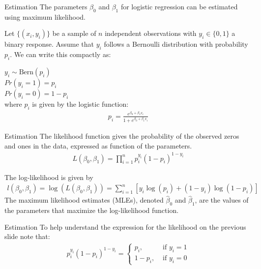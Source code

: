 \documentclass[10pt]{beamer}\usepackage[]{graphicx}\usepackage[]{color}
\begin{document}
\begin{frame}{Estimation}
The parameters $\beta_0$ and $\beta_1$ for logistic regression can be estimated using maximum likelihood.\\
\vspace{10pt}

Let $\{(x_i, y_i)\}$ be a sample of $n$ independent observations with $y_i \in \{0,1\}$ a binary response. Assume that $y_i$ follows a Bernoulli distribution with probability $p_i$.  We can write this compactly as:
\vspace{10pt}

$y_i \sim \text{Bern}(p_i)$\\
$Pr(y_i = 1) = p_i$\\
$Pr(y_i = 0) = 1 - p_i$\\
where $p_i$ is given by the logistic function:
\begin{align*}
p_i = \frac{e^{\beta_0 + \beta_1 x_i}}{1 + e^{\beta_0 + \beta_1 x_i}}
\end{align*}
\end{frame}

\begin{frame}{Estimation}
The likelihood function gives the probability of the observed zeros and ones in the data, expressed as function of the parameters. 
\begin{align*}
L(\beta_0, \beta_1) = \prod_{i=1}^n p_i^{y_i} (1-p_i)^{1-y_i}
\end{align*}
\vspace{10pt}

The log-likelihood is given by 
\begin{align*}
l(\beta_0, \beta_1) = \log(L(\beta_0, \beta_1))
= \sum_{i=1}^n [ y_i \log(p_i) + (1-y_i) \log(1-p_i)]
\end{align*}
The maximum likelihood estimates (MLEs), denoted $\hat{\beta}_0$ and $\hat{\beta}_1$, are the values of the parameters that maximize the log-likelihood function.
\end{frame}

\begin{frame}{Estimation}
To help understand the expression for the likelihood on the previous slide note that:
\begin{align*}
p_i^{y_i} (1-p_i)^{1-y_i} = 
\begin{cases}
p_i, &\text{ if $y_i=1$}\\ 
1-p_i, &\text{ if $y_i=0$} 
\end{cases}
\end{align*}
\end{frame}
\end{document}
